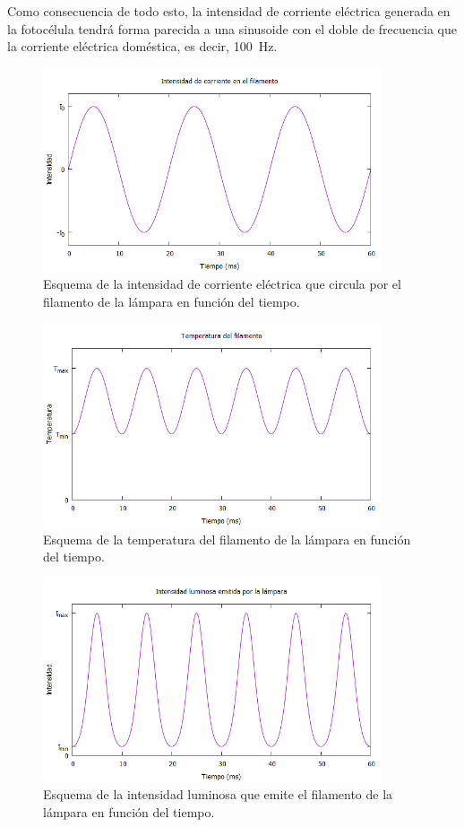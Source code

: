 \documentclass[12pt]{article}
\numberwithin{table}{section}
\numberwithin{figure}{section}
\numberwithin{equation}{section}
\begin{document}
Como consecuencia de todo esto, la intensidad de corriente eléctrica generada en la fotocélula tendrá forma parecida a una sinusoide con el doble de frecuencia que la corriente eléctrica doméstica, es decir, \SI{100}{Hz}.

\begin{figure}[!ht]
	\begin{center}
		\includegraphics[width=10cm]{P10Intensidadfilamento.png}
		\caption{Esquema de la intensidad de corriente eléctrica que circula por el filamento de la lámpara en función del tiempo.}\label{P10intensidadfilamento}
	\end{center}
\end{figure}
\begin{figure}[!ht]
	\begin{center}
		\includegraphics[width=10cm]{P10Temperatura.png}
		\caption{Esquema de la temperatura del filamento de la lámpara en función del tiempo.}\label{P10temperatura}
	\end{center}
\end{figure}
\begin{figure}[!ht]
	\begin{center}
		\includegraphics[width=10cm]{P10Intensidadluminosa.png}
		\caption{Esquema de la intensidad luminosa que emite el filamento de la lámpara en función del tiempo.}\label{P10intensidadluminosa}
	\end{center}
\end{figure}
\end{document}
